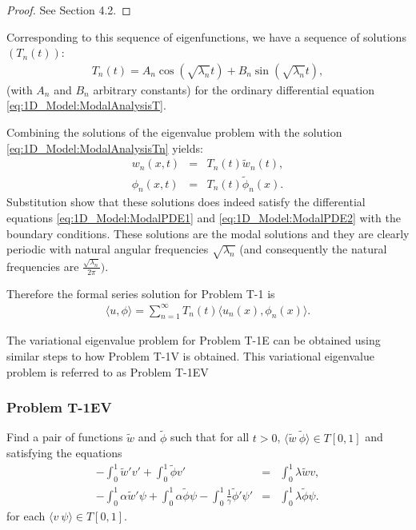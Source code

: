 \documentclass[../../main.tex]{subfiles}
\begin{document}
\begin{proof}
	See Section 4.2.
\end{proof}

Corresponding to this sequence of eigenfunctions, we have a sequence of solutions $(T_n(t))$:
\begin{eqnarray}
	T_n(t)=A_n\cos(\sqrt{\lambda_n}t)+B_n\sin(\sqrt{\lambda_n}t), \label{eq:1D_Model:ModalAnalysisTn}
\end{eqnarray}
(with $A_n$ and $B_n$ arbitrary constants) for the ordinary differential equation \eqref{eq:1D_Model:ModalAnalysisT}.

Combining the solutions of the eigenvalue problem with the solution \eqref{eq:1D_Model:ModalAnalysisTn} yields:
\begin{eqnarray*}
	w_n(x,t) & = & T_n(t)\tilde{w}_n(t), \\
	\phi_n(x,t) & = & T_n(t)\tilde{\phi}_n(x).
\end{eqnarray*} 
Substitution show that these solutions does indeed satisfy the differential equations \eqref{eq:1D_Model:ModalPDE1} and \eqref{eq:1D_Model:ModalPDE2} with the boundary conditions. These solutions are the modal solutions and they are clearly periodic with natural angular frequencies $\sqrt{\lambda_n}$ (and consequently the natural frequencies are $\frac{\sqrt{\lambda_n}}{2 \pi})$.

Therefore the formal series solution for Problem T-1 is
\begin{eqnarray*}
	\langle u, \phi \rangle = \sum_{n=1}^{\infty} T_n(t)\langle u_n(x), \phi_n(x)\rangle.
\end{eqnarray*}

The variational eigenvalue problem for Problem T-1E can be obtained using similar steps to how Problem T-1V is obtained. This variational eigenvalue problem is referred to as Problem T-1EV

\subsubsection*{Problem T-1EV}\label{sssec:1D_Model:ProblemT1EV}
Find a pair of functions $\tilde{w}$ and $\tilde{\phi}$ such that for all $t >0$, $\langle \tilde{w}\ \tilde{\phi}\rangle \in  T[0,1]$ and satisfying the equations
\begin{eqnarray*}
	 -\int_0^1 \tilde{w}'v'  + \int_0^1 \tilde{\phi} v' &=& \int_0^1 \lambda \tilde{w} v ,\\
	 -\int_0^1\alpha \tilde{w}' \psi + \int_0^1\alpha \tilde{\phi} \psi - \int_0^1\frac{1}{\gamma}\tilde{\phi}' \psi' &=& \int_0^1 \lambda \tilde{\phi} \psi .
\end{eqnarray*} for each $\langle v \ \psi\rangle \in T[0,1]$.
\end{document}
